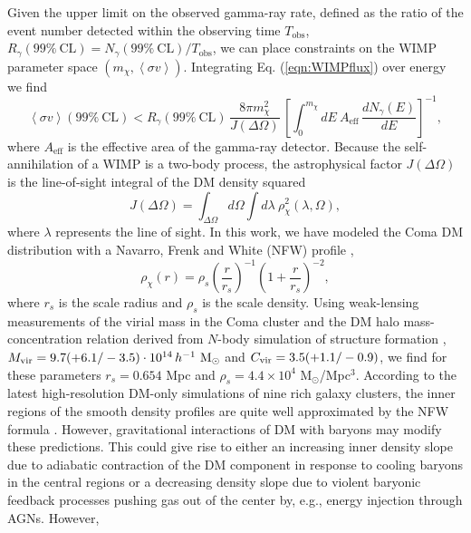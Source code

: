 \documentclass[12pt,manuscript]{aastex}
\newcommand{\expval}[1]{\left\langle #1 \right\rangle}
\begin{document}
Given the upper limit on the observed gamma-ray rate, defined as the ratio of the event number detected within the observing time $T_{\mathrm{obs}}$,
$R_{\gamma}(99\%\ \mathrm{CL}) = N_{\gamma}(99\%\ \mathrm{CL}) / T_{\mathrm{obs}}$, we can place
constraints on the WIMP parameter space $(m_{\chi}, \expval{\sigma v})$. Integrating Eq.
(\ref{eqn:WIMPflux}) over energy we find
\begin{equation}
\expval{\sigma v}(99\%\ \mathrm{CL}) <
R_{\gamma}(99\%\ \mathrm{CL})\, \frac{8\pi m_{\chi}^{2}}{J(\Delta\Omega)}\,
\left[\int^{m_{\chi}}_{0} dE\ A_{\mathrm{eff}}\,\frac{dN_\gamma (E)}{dE}\right]^{-1},
\end{equation}
where $A_{\mathrm{eff}}$ is the effective area of the gamma-ray detector.
Because the self-annihilation of a WIMP is a two-body process, the astrophysical factor
$J(\Delta\Omega)$ is the line-of-sight integral of the DM density squared
\begin{equation}
J(\Delta\Omega)=\int_{\Delta\Omega}d\Omega\int d\lambda\ \rho_{\chi}^{2}(\lambda,\Omega),
\end{equation}
where $\lambda$ represents the line of sight. In this work, we have modeled the Coma DM
distribution with a Navarro, Frenk and White (NFW) profile \citep{article:NavarroFrenkWhite:1997},
\begin{equation}
\rho_{\chi}(r)=\rho_{s}\left(\frac{r}{r_{s}}\right)^{-1}\left(1+\frac{r}{r_{s}}\right)^{-2},
\end{equation}
where $r_{s}$ is the scale radius and $\rho_{s}$ is the scale density. Using weak-lensing
measurements of the virial mass in the Coma cluster \citep{article:Gavazzi_etal:2009} and the DM
halo mass-concentration relation derived from $N$-body simulation of structure formation
\citep{article:Bullock_etal:2001}, $M_{\rm vir} =9.7(+6.1/-3.5)\cdot 10^{14}\,
h^{-1}\ {\rm M_\odot}$ and $C_{\rm vir}=3.5(+1.1/-0.9)$,
we find 
for these parameters $r_{s}=0.654$ Mpc and
$\rho_{s}=4.4\times 10^{4}$ M$_{\odot}$/Mpc$^{3}$. 
According to the latest high-resolution DM-only
simulations of nine rich galaxy clusters, the inner regions of the smooth density profiles are quite
well approximated by the NFW formula \citep{article:Gao_etal:2012}. However, gravitational
interactions of DM with baryons may modify these predictions. This could give rise to either an
increasing inner density slope due to adiabatic contraction of the DM component in response to
cooling baryons in the central regions or a decreasing density slope due to violent baryonic
feedback processes pushing gas out of the center by, e.g., energy injection through AGNs. However,
\end{document}
